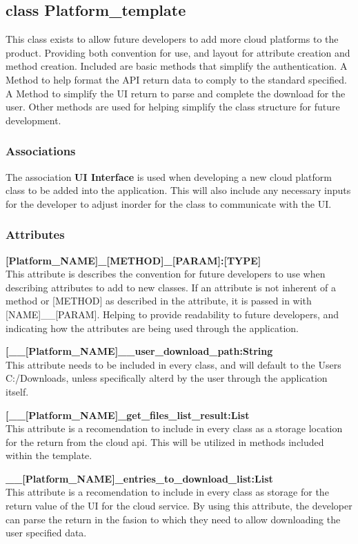 \subsection{class Platform\_template}
This class exists to allow future developers to add more cloud platforms to the product. Providing both convention for use, and layout 
for attribute creation and method creation. Included are basic methods that simplify the authentication. A Method to help format the 
API return data to comply to the standard specified. A Method to simplify the UI return to parse and complete the download for the user.
Other methods are used for helping simplify the class structure for future development. 
​
\subsubsection{Associations}
The association \textbf{UI Interface} is used when developing a new cloud platform class to be added into the application. This will also 
include any necessary inputs for the developer to adjust inorder for the class to communicate with the UI. 
​

\subsubsection{Attributes}
\textbf{[Platform\_NAME]\_[METHOD]\_[PARAM]:[TYPE]} \\
This attribute is describes the convention for future developers to use when describing attributes to add to new classes. 
If an attribute is not inherent of a method or [METHOD] as described in the attribute, it is passed in with [NAME]\_\_[PARAM].
Helping to provide readability to future developers, and indicating how the attributes are being used through the application.

\textbf{[\_\_[Platform\_NAME]\_\_user\_download\_path:String} \\
This attribute needs to be included in every class, and will default to the Users C:/Downloads, unless specifically alterd by the user 
through the application itself. 

\textbf{[\_\_[Platform\_NAME]\_get\_files\_list\_result:List} \\
This attribute is a recomendation to include in every class as a storage location for the return from the cloud api. This will be 
utilized in methods included within the template. 

\textbf{\_\_[Platform\_NAME]\_entries\_to\_download\_list:List} \\
This attribute is a recomendation to include in every class as storage for the return value of the UI for the cloud service. By using
this attribute, the developer can parse the return in the fasion to which they need to allow downloading the user specified data.

